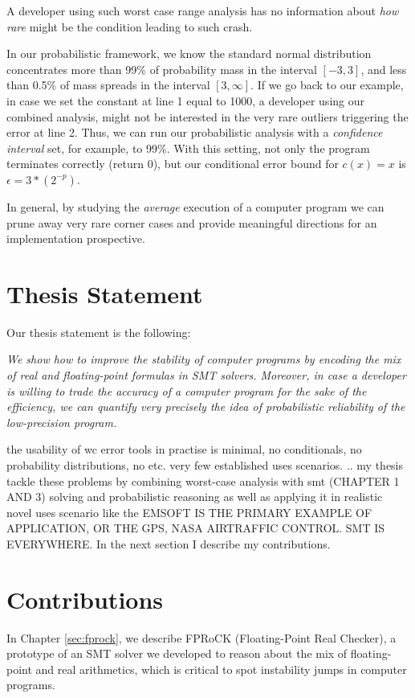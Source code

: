 %
A developer using such worst case range analysis has no information about \emph{how rare} might be the condition leading to such crash. 
%

In our probabilistic framework, we know the standard normal distribution concentrates more than 99\% of probability mass in the interval $[−3, 3]$, and less than 0.5\% of mass spreads in the interval $[3, \infty]$.
%
If we go back to our example, in case we set the constant at line 1 equal to 1000, a developer using our combined analysis, might not be interested in the very rare outliers triggering the error at line 2.
%
Thus, we can run our probabilistic analysis with a \emph{confidence interval} set, for example, to 99\%.
%
%
With this setting, not only the program terminates correctly (return 0), but our conditional error bound for $c(x)=x$ is $\epsilon = 3*(2^{-p})$.
%

In general, by studying the \emph{average} execution of a computer program we can prune away very rare corner cases and provide meaningful directions for an implementation prospective.
%
\section{Thesis Statement}
%
Our thesis statement is the following: 

%
\emph{We show how to improve the stability of computer programs by encoding the mix of real and floating-point formulas in SMT solvers.
%
Moreover, in case a developer is willing to trade the accuracy of a computer program for the sake of the efficiency, we can quantify very precisely the idea of probabilistic reliability of the low-precision program.}

%

the usability of wc error tools in practise is minimal, no conditionals, no probability distributions, no etc. very few established uses scenarios. 
.. my thesis tackle these problems by combining worst-case analysis with smt (CHAPTER 1 AND 3) solving and probabilistic reasoning as well as applying it in realistic novel uses scenario like the EMSOFT IS THE PRIMARY EXAMPLE OF APPLICATION, OR THE GPS, NASA AIRTRAFFIC CONTROL.
SMT IS EVERYWHERE. 
%
In the next section I describe my contributions.
%
\section{Contributions}
%
In Chapter \ref{sec:fprock}, we describe FPRoCK (Floating-Point Real Checker), a prototype of an SMT solver we developed to reason about the mix of floating-point and real arithmetics, which is critical to spot instability jumps in computer programs.

